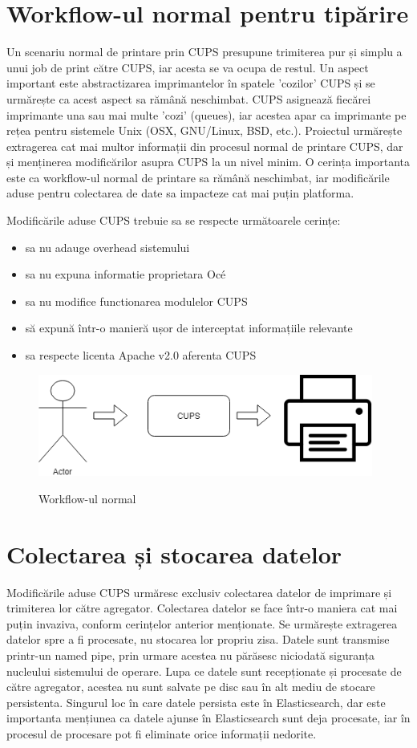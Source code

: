 \documentclass[a4paper, 12pt, twoside]{report}
\begin{document}
	\section{Workflow-ul normal pentru tipărire}
Un scenariu normal de printare prin CUPS presupune trimiterea pur și simplu a unui job de print către CUPS, iar acesta se va ocupa de restul. Un aspect important este abstractizarea imprimantelor în spatele 'cozilor' CUPS și se urmărește ca acest aspect sa rămână neschimbat. CUPS asignează fiecărei imprimante una sau mai multe 'cozi' (queues), iar acestea apar ca imprimante pe rețea pentru sistemele Unix (OSX, GNU/Linux, BSD, etc.).
Proiectul urmărește extragerea cat mai multor informații din procesul normal de printare CUPS, dar și menținerea modificărilor asupra CUPS la un nivel minim. O cerința importanta este ca workflow-ul normal de printare sa rămână neschimbat, iar modificările aduse pentru colectarea de date sa impacteze cat mai puțin platforma.

Modificările aduse CUPS trebuie sa se respecte următoarele cerințe:
\begin{itemize}
\item sa nu adauge overhead sistemului
\item sa nu expuna informatie proprietara Océ
\item sa nu modifice functionarea modulelor CUPS
\item să expună într-o manieră ușor de interceptat informațiile relevante
\item sa respecte licenta Apache v2.0 aferenta CUPS
\end{itemize}


\begin{figure}[h]
		\centering
			{\includegraphics[width=110mm]{workflow.png}}
		\caption{Workflow-ul normal}
\end{figure}

	\section{Colectarea și stocarea datelor}
Modificările aduse CUPS urmăresc exclusiv colectarea datelor de imprimare și trimiterea lor către agregator. Colectarea datelor se face într-o maniera cat mai puțin invaziva, conform cerințelor anterior menționate. Se urmărește extragerea datelor spre a fi procesate, nu stocarea lor propriu zisa. Datele sunt transmise printr-un named pipe, prin urmare acestea nu părăsesc niciodată siguranța nucleului sistemului de operare. Lupa ce datele sunt recepționate și procesate de către agregator, acestea nu sunt salvate pe disc sau în alt mediu de stocare persistenta. Singurul loc în care datele persista este în Elasticsearch, dar este importanta mențiunea ca datele ajunse în Elasticsearch sunt deja procesate, iar în procesul de procesare pot fi eliminate orice informații nedorite.
\end{document}
